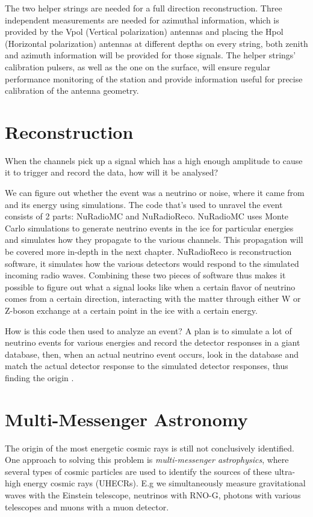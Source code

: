 The two helper strings are needed for a full direction reconstruction.
Three independent measurements are needed for azimuthal information, which is
provided by the Vpol (Vertical polarization) antennas and placing the Hpol
(Horizontal polarization) antennas at different depths on every string, both
zenith and azimuth information will be provided for those signals. The helper
strings' calibration pulsers, as well as the one on the surface, will ensure
regular performance monitoring of the station and provide information
useful for precise calibration of the antenna geometry.

\section{Reconstruction}
\label{sec:Reconstruction}
When the channels pick up a signal which has a high enough amplitude to
cause it to trigger and record the data, how will it be analysed?

We can figure out whether the event was a neutrino or noise, where it came from
and its energy using simulations. The code that's used to unravel the event
consists of 2 parts: NuRadioMC\cite{Glaser_2020} and
NuRadioReco\cite{Glaser_2019}. NuRadioMC uses Monte Carlo simulations to
generate neutrino events in the ice for particular energies and simulates how
they propagate to the various channels. This propagation will be covered more
in-depth in the next chapter.  NuRadioReco is reconstruction software, it
simulates how the various detectors would respond to the simulated incoming
radio waves.  Combining these two pieces of software thus makes it possible to
figure out what a signal looks like when a certain flavor of neutrino  
comes from a certain direction, interacting with the matter through
either W or Z-boson exchange at a certain point in the ice with a certain
energy. 

How is this code then used to analyze an event?
A plan \cite{lookuptable} is to simulate a lot of neutrino events for various energies and
record the detector responses in a giant database, then, when an actual neutrino
event occurs, look in the database and match the actual
detector response to the simulated detector responses, thus finding the origin .

\section{Multi-Messenger Astronomy}
The origin of the most energetic cosmic rays is still not conclusively
identified. One approach to solving this problem is \textit{multi-messenger
astrophysics}, where several types of cosmic particles are used to identify the
sources of these ultra-high energy cosmic rays (UHECRs). E.g we simultaneously
measure gravitational waves with the Einstein telescope, neutrinos with RNO-G,
photons with various telescopes and muons with a muon detector.

